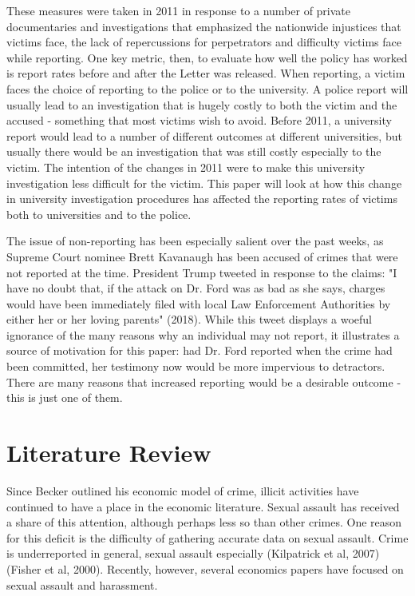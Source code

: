 \documentclass[AER]{AEA}
\begin{document}
These measures were taken in 2011 in response to a number of private documentaries and investigations that emphasized the nationwide injustices that victims face, the lack of repercussions for perpetrators and difficulty victims face while reporting. One key metric, then, to evaluate how well the policy has worked is report rates before and after the Letter was released. When reporting, a victim faces the choice of reporting to the police or to the university. A police report will usually lead to an investigation that is hugely costly to both the victim and the accused - something that most victims wish to avoid. Before 2011, a university report would lead to a number of different outcomes at different universities, but usually there would be an investigation that was still costly especially to the victim. The intention of the changes in 2011 were to make this university investigation less difficult for the victim. This paper will look at how this change in university investigation procedures has affected the reporting rates of victims both to universities and to the police.

The issue of non-reporting has been especially salient over the past weeks, as Supreme Court nominee Brett Kavanaugh has been accused of crimes that were not reported at the time. President Trump tweeted in response to the claims: "I have no doubt that, if the attack on Dr. Ford was as bad as she says, charges would have been immediately filed with local Law Enforcement Authorities by either her or her loving parents" (2018). While this tweet displays a woeful ignorance of the many reasons why an individual may not report, it illustrates a source of motivation for this paper: had Dr. Ford reported when the crime had been committed, her testimony now would be more impervious to detractors. There are many reasons that increased reporting would be a desirable outcome - this is just one of them. 

\section{Literature Review}

Since Becker outlined his economic model of crime, illicit activities have continued to have a place in the economic literature. Sexual assault has received a share of this attention, although perhaps less so than other crimes. One reason for this deficit is the difficulty of gathering accurate data on sexual assault. Crime is underreported in general, sexual assault especially (Kilpatrick et al, 2007) (Fisher et al, 2000). Recently, however, several economics papers have focused on sexual assault and harassment. 
\end{document}
